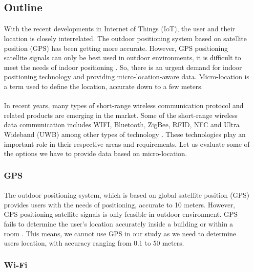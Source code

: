 \documentclass[12pt]{article}
\begin{document}
\subsection{Outline}

\paragraph{}With the recent developments in Internet of Things (IoT), the user and their location is closely interrelated. The outdoor positioning system based on satellite position (GPS) has been getting more accurate. However, GPS positioning satellite signals can only be best used in outdoor environments, it is difficult to meet the needs of indoor positioning  \cite{indoor}. So, there is an urgent demand for indoor positioning technology and providing micro-location-aware data. Micro-location is a term used to define the location, accurate down to a few meters. 

\paragraph{}In recent years, many types of short-range wireless communication protocol and related products are emerging in the market. Some of the short-range wireless data communication includes WIFI, Bluetooth, ZigBee, RFID, NFC and Ultra Wideband (UWB) among other types of technology \cite{indoorPositioning}. These technologies play an important role in their respective areas and requirements. Let us evaluate some of the options we have to provide data based on micro-location.

\subsubsection{GPS}
\paragraph{} The outdoor positioning system, which is based on global satellite position (GPS) provides users with the needs of positioning, accurate to 10 meters. However, GPS positioning satellite signals is only feasible in outdoor environment. GPS fails to determine the user's location accurately inside a building or within a room \cite{indoor}. This means, we cannot use GPS in our study as we need to determine users location, with accuracy ranging from 0.1 to 50 meters.

\subsubsection{Wi-Fi}
\end{document}
